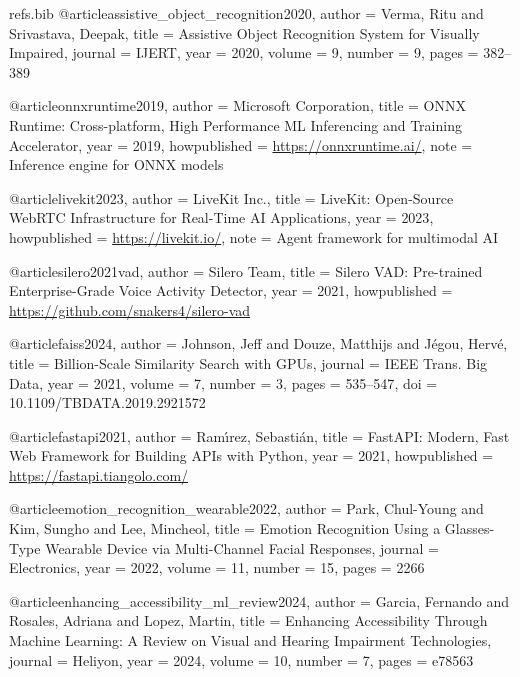 \begin{filecontents*}{refs.bib}
@article{assistive_object_recognition2020,
  author    = {Verma, Ritu and Srivastava, Deepak},
  title     = {Assistive Object Recognition System for Visually Impaired},
  journal   = {IJERT},
  year      = {2020},
  volume    = {9},
  number    = {9},
  pages     = {382--389}
}


@article{onnxruntime2019,
  author    = {{Microsoft Corporation}},
  title     = {{ONNX Runtime}: Cross-platform, High Performance {ML} Inferencing and Training Accelerator},
  year      = {2019},
  howpublished = {\url{https://onnxruntime.ai/}},
  note      = {Inference engine for ONNX models}
}

@article{livekit2023,
  author    = {{LiveKit Inc.}},
  title     = {{LiveKit}: Open-Source {WebRTC} Infrastructure for Real-Time AI Applications},
  year      = {2023},
  howpublished = {\url{https://livekit.io/}},
  note      = {Agent framework for multimodal AI}
}

@article{silero2021vad,
  author    = {Silero Team},
  title     = {Silero {VAD}: Pre-trained Enterprise-Grade Voice Activity Detector},
  year      = {2021},
  howpublished = {\url{https://github.com/snakers4/silero-vad}}
}

@article{faiss2024,
  author    = {Johnson, Jeff and Douze, Matthijs and J{\'e}gou, Herv{\'e}},
  title     = {Billion-Scale Similarity Search with {GPUs}},
  journal   = {IEEE Trans. Big Data},
  year      = {2021},
  volume    = {7},
  number    = {3},
  pages     = {535--547},
  doi       = {10.1109/TBDATA.2019.2921572}
}

@article{fastapi2021,
  author    = {Ram{\'\i}rez, Sebasti{\'a}n},
  title     = {{FastAPI}: Modern, Fast Web Framework for Building {APIs} with {Python}},
  year      = {2021},
  howpublished = {\url{https://fastapi.tiangolo.com/}}
}


@article{emotion_recognition_wearable2022,
  author    = {Park, Chul-Young and Kim, Sungho and Lee, Mincheol},
  title     = {Emotion Recognition Using a Glasses-Type Wearable Device via Multi-Channel Facial Responses},
  journal   = {Electronics},
  year      = {2022},
  volume    = {11},
  number    = {15},
  pages     = {2266}
}

@article{enhancing_accessibility_ml_review2024,
  author    = {Garcia, Fernando and Rosales, Adriana and Lopez, Martin},
  title     = {Enhancing Accessibility Through Machine Learning: A Review on Visual and Hearing Impairment Technologies},
  journal   = {Heliyon},
  year      = {2024},
  volume    = {10},
  number    = {7},
  pages     = {e78563}
}


\end{filecontents*}
